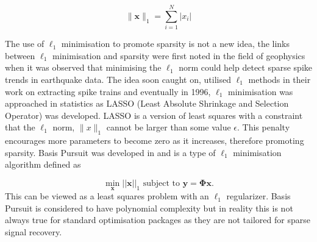 \documentclass[conference]{IEEEtran}
\DeclareMathOperator*{\argmin}{arg\,min}
\begin{document}
\begin{equation}
\label{eq:57}
  \|\boldsymbol{x}\|_1 = \sum_{i=1}^{N}|x_i|
\end{equation}

The use of $\ell_1$ minimisation to promote sparsity is not a new idea, the links between $\ell_1$ minimisation and sparsity were first noted in the field of geophysics when it was observed \cite{claerbout1973} that minimising the $\ell_1$ norm could help detect sparse spike trends in earthquake data. The idea soon caught on, \cite{taylor1979} utilised $\ell_1$ methods in their work on extracting spike trains and eventually in 1996, $\ell_1$ minimisation was approached in statistics as LASSO \cite{tibshirani1996} (Least Absolute Shrinkage and Selection Operator) was developed. LASSO is a version of least squares with a constraint that the $\ell_1$ norm, $\|x\|_1$ cannot be larger than some value $\epsilon$. This penalty encourages more parameters to become zero as it increases, therefore promoting sparsity. Basis Pursuit was developed in \cite{chen2001} and is a type of $\ell_1$ minimisation algorithm defined as 

\begin{equation}
  \label{eq:4}
  \min_{\boldsymbol{x}} ||\boldsymbol{x}||_1 \text{ subject to } \boldsymbol{y} = \boldsymbol{\Phi} \boldsymbol{x}.
\end{equation}
This can be viewed as a least squares problem with an $\ell_1$ regularizer. Basis Pursuit is considered to have polynomial complexity but in reality this is not always true for standard optimisation packages as they are not tailored for sparse signal recovery. 

\end{document}
